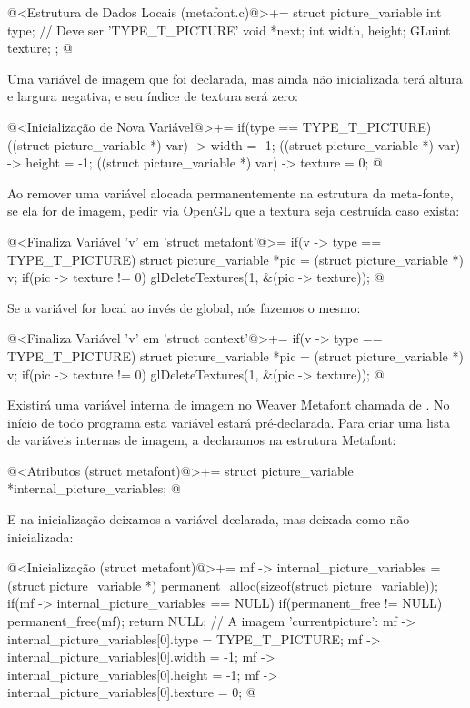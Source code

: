 \iniciocodigo
@<Estrutura de Dados Locais (metafont.c)@>+=
struct picture_variable{
  int type; // Deve ser 'TYPE_T_PICTURE'
  void *next;
  int width, height;
  GLuint texture;
};
@
\fimcodigo

Uma variável de imagem que foi declarada, mas ainda não inicializada
terá altura e largura negativa, e seu índice de textura será zero:

\iniciocodigo
@<Inicialização de Nova Variável@>+=
if(type == TYPE_T_PICTURE){
  ((struct picture_variable *) var) -> width = -1;
  ((struct picture_variable *) var) -> height = -1;
  ((struct picture_variable *) var) -> texture = 0;
}
@
\fimcodigo

Ao remover uma variável alocada permanentemente na estrutura da
meta-fonte, se ela for de imagem, pedir via OpenGL que a textura seja
destruída caso exista:

\iniciocodigo
@<Finaliza Variável 'v' em 'struct metafont'@>=
if(v -> type == TYPE_T_PICTURE){
  struct picture_variable *pic = (struct picture_variable *) v;
  if(pic -> texture != 0)
    glDeleteTextures(1, &(pic -> texture));
}
@
\fimcodigo

Se a variável for local ao invés de global, nós fazemos o mesmo:

\iniciocodigo
@<Finaliza Variável 'v' em 'struct context'@>+=
if(v -> type == TYPE_T_PICTURE){
  struct picture_variable *pic = (struct picture_variable *) v;
  if(pic -> texture != 0)
    glDeleteTextures(1, &(pic -> texture));
}
@
\fimcodigo

Existirá uma variável interna de imagem no Weaver Metafont chamada
de . No início de todo programa esta
variável estará pré-declarada. Para criar uma lista de variáveis
internas de imagem, a declaramos na estrutura Metafont:

\iniciocodigo
@<Atributos (struct metafont)@>+=
struct picture_variable *internal_picture_variables;
@
\fimcodigo

E na inicialização deixamos a variável 
declarada, mas deixada como não-inicializada:

\iniciocodigo
@<Inicialização (struct metafont)@>+=
mf -> internal_picture_variables = (struct picture_variable *)
                                   permanent_alloc(sizeof(struct picture_variable));
if(mf -> internal_picture_variables == NULL){
  if(permanent_free != NULL)
    permanent_free(mf);
  return NULL;
}
// A imagem 'currentpicture':
mf -> internal_picture_variables[0].type = TYPE_T_PICTURE;
mf -> internal_picture_variables[0].width = -1;
mf -> internal_picture_variables[0].height = -1;
mf -> internal_picture_variables[0].texture = 0;
@
\fimcodigo

